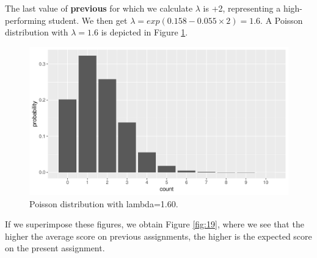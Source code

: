 \documentclass[]{book}\usepackage[]{graphicx}\usepackage[]{color}
\makeatletter
\def\maxwidth{ %
  \ifdim\Gin@nat@width>\linewidth
    \linewidth
  \else
    \Gin@nat@width
  \fi
}
\newenvironment{knitrout}{}{} %
\makeatother
\begin{document}
The last value of \textbf{previous} for which we calculate $\lambda$ is +2, representing a high-performing student. We then get $\lambda=exp(0.158  -0.055 \times 2)= 1.6$. A Poisson distribution with $\lambda=1.6$ is depicted in Figure \ref{fig:gen_18}.

\begin{knitrout}
\color{fgcolor}\begin{figure}

{\centering \includegraphics[width=\maxwidth]{figure/gen_18-1} 

}

\caption[Poisson distribution with lambda=1.60]{Poisson distribution with lambda=1.60.}\label{fig:gen_18}
\end{figure}


\end{knitrout}


If we superimpose these figures, we obtain Figure \ref{fig:19}, where we see that the higher the average score on previous assignments, the higher is the expected score on the present assignment.
\end{document}
